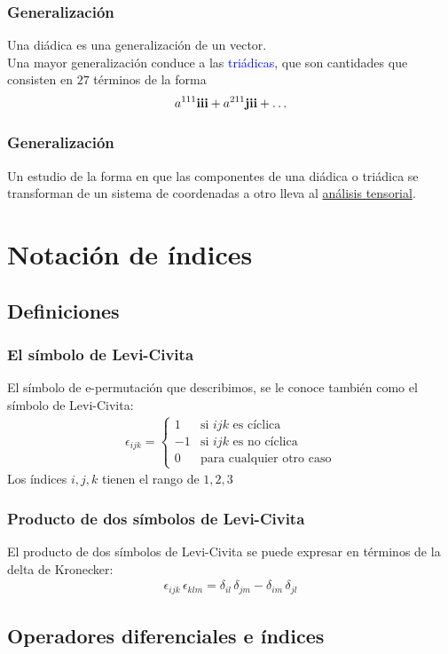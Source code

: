 \documentclass[12pt]{beamer}
\begin{document}
\begin{frame}
\frametitle{Generalización}
Una diádica es una generalización de un vector.
\\
\bigskip
\pause
Una mayor generalización conduce a las \textcolor{blue}{triádicas}, que son cantidades que consisten en $27$ términos de la forma
\begin{align*}
a^{111} \vb{iii} + a^{211} \vb{jii} + \ldots 
\end{align*}
\end{frame}
\begin{frame}
\frametitle{Generalización}
Un estudio de la forma en que las componentes de una diádica o triádica se transforman de un sistema de coordenadas a otro lleva al \underline{análisis tensorial}.
\end{frame}

\section{Notación de índices}
\subsection{Definiciones}

\begin{frame}
\frametitle{El símbolo de Levi-Civita}
El símbolo de e-permutación que describimos, se le conoce también como el símbolo de Levi-Civita:
\begin{align*}
\epsilon_{ijk} = \begin{cases}
1 & \mbox{si } ijk \mbox{ es cíclica} \\
-1 & \mbox{si } ijk \mbox{ es no cíclica} \\
0 & \mbox{para cualquier otro caso}
\end{cases}
\end{align*}
Los índices $i, j, k$ tienen el rango de $1, 2, 3$
\end{frame}
\begin{frame}
\frametitle{Producto de dos símbolos de Levi-Civita}
El producto de dos símbolos de Levi-Civita se puede expresar en términos de la delta de Kronecker:
\begin{align*}
\epsilon_{ijk} \, \epsilon_{klm} = \delta_{il} \, \delta_{jm} - \delta_{im} \, \delta_{jl}
\end{align*}
\end{frame}

\subsection{Operadores diferenciales e índices}
\end{document}
